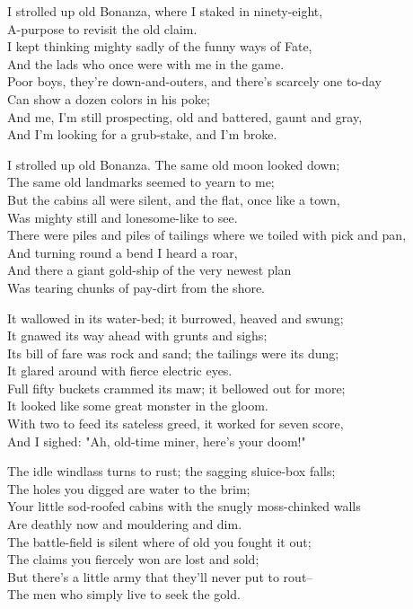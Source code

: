 
\begin{poemblock}
I strolled up old Bonanza, where I staked in ninety-eight,\\
\idt A-purpose to revisit the old claim.\\
I kept thinking mighty sadly of the funny ways of Fate,\\
\idt And the lads who once were with me in the game.\\
Poor boys, they're down-and-outers, and there's scarcely one to-day\\
\idt Can show a dozen colors in his poke;\\
And me, I'm still prospecting, old and battered, gaunt and gray,\\
\idt And I'm looking for a grub-stake, and I'm broke.

I strolled up old Bonanza.  The same old moon looked down;\\
\idt The same old landmarks seemed to yearn to me;\\
But the cabins all were silent, and the flat, once like a town,\\
\idt Was mighty still and lonesome-like to see.\\
There were piles and piles of tailings where we toiled with pick and pan,\\
\idt And turning round a bend I heard a roar,\\
And there a giant gold-ship of the very newest plan\\
\idt Was tearing chunks of pay-dirt from the shore.

It wallowed in its water-bed; it burrowed, heaved and swung;\\
\idt It gnawed its way ahead with grunts and sighs;\\
Its bill of fare was rock and sand; the tailings were its dung;\\
\idt It glared around with fierce electric eyes.\\
Full fifty buckets crammed its maw; it bellowed out for more;\\
\idt It looked like some great monster in the gloom.\\
With two to feed its sateless greed, it worked for seven score,\\
\idt And I sighed:  "Ah, old-time miner, here's your doom!"

The idle windlass turns to rust; the sagging sluice-box falls;\\
\idt The holes you digged are water to the brim;\\
Your little sod-roofed cabins with the snugly moss-chinked walls\\
\idt Are deathly now and mouldering and dim.\\
The battle-field is silent where of old you fought it out;\\
\idt The claims you fiercely won are lost and sold;\\
But there's a little army that they'll never put to rout--\\
\idt The men who simply live to seek the gold.


\end{poemblock}
